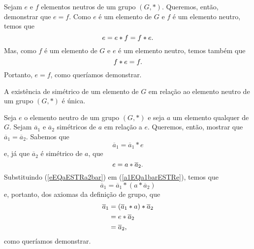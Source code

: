 \begin{dem}
  Sejam $e$ e $f$ elementos neutros de um grupo $(G,\ast)$. Queremos,
  então, demonstrar que $e=f$. Como $e$ é um elemento de $G$ e $f$ é um
  elemento neutro, temos que
  \begin{equation*}
    e = e\ast f = f\ast e\mathrm{.}
  \end{equation*}
  Mas, como $f$ é um elemento de $G$ e $e$ é um elemento neutro, temos
  também que
  \begin{equation*}
    f\ast e = f\mathrm{.}
  \end{equation*}
  Portanto, $e = f$, como queríamos demonstrar.
\end{dem}

\begin{Propr}
  A existência de simétrico de um elemento de $G$ em relação ao
  elemento neutro de um grupo $(G,\ast )$ é única.
\end{Propr}

\begin{dem}
  Seja $e$ o elemento neutro de um grupo $(G,\ast )$ e seja $a$ um
  elemento
  qualquer de $G$. Sejam $\overline{a}_1$ e $\overline{a}_2$ simétricos
  de $a$ em relação a $e$. Queremos, então, mostrar que
  $\overline{a}_1 = \overline{a}_2$. Sabemos que
  \begin{equation}\label{a1EQa1barESTRe}
    \overline{a}_1 = \overline{a}_1\ast e
  \end{equation}
  e, já que $\overline{a}_2$ é simétrico de $a$, que
  \begin{equation}\label{eEQaESTRa2bar}
    e = a\ast \overline{a}_2\mathrm{.}
  \end{equation}
  Substituindo (\ref{eEQaESTRa2bar}) em (\ref{a1EQa1barESTRe}),
  temos que
  \begin{equation*}
    \overline{a}_1 = \overline{a}_1\ast (a\ast \overline{a}_2)
  \end{equation*}
  e, portanto, dos axiomas da definição de grupo, que
  \begin{equation*}
    \begin{aligned}
      \overline{a}_1 &= (\overline{a}_1\ast a)\ast \overline{a}_2\\
                     &= e\ast \overline{a}_2\\
                     &= \overline{a}_2\mathrm{,}
    \end{aligned}
  \end{equation*}
  como queríamos demonstrar.
\end{dem}

